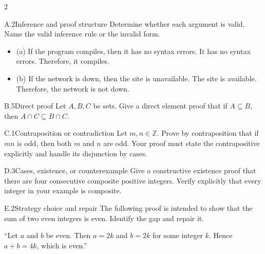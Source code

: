 \documentclass[9pt]{extarticle}
\begin{document}
\begin{multicols}{2}
\begin{CoreProblem}{A.2}{Inference and proof structure}
Determine whether each argument is valid. Name the valid inference rule or the invalid form.
\begin{itemize}
  \item (a) If the program compiles, then it has no syntax errors. It has no syntax errors. Therefore, it compiles.
  \item (b) If the network is down, then the site is unavailable. The site is
        available. Therefore, the network is not down.
\end{itemize}
\end{CoreProblem}
\begin{CoreProblem}{B.5}{Direct proof}
Let $A,B,C$ be sets. Give a direct element proof that if $A\subseteq B$, then
$A\cap C\subseteq B\cap C$.
\end{CoreProblem}
\begin{CoreProblem}{C.1}{Contraposition or contradiction}
Let $m,n\in\mathbb Z$. Prove by contraposition that if $mn$ is odd, then both
$m$ and $n$ are odd. Your proof must state the contrapositive explicitly and
handle its disjunction by cases.
\end{CoreProblem}
\columnbreak
\begin{CoreProblem}{D.3}{Cases, existence, or counterexample}
Give a constructive existence proof that there are four consecutive composite
positive integers. Verify explicitly that every integer in your example is
composite.
\end{CoreProblem}
\begin{CoreProblem}{E.2}{Strategy choice and repair}
The following proof is intended to show that the sum of two even integers is even. Identify the gap and repair it.

``Let $a$ and $b$ be even. Then $a=2k$ and $b=2k$ for some integer $k$. Hence $a+b=4k$, which is even.''
\end{CoreProblem}
\end{multicols}
\CoreWorkArea
\FormBreak
{}
\end{document}
